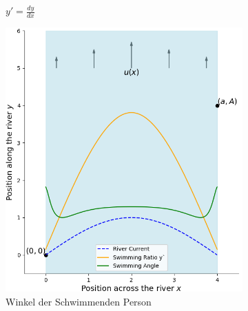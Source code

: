 \begin{figure}
\begin{subfigure}{0.48\textwidth}
        \caption{\(y' = \frac{dy}{dx}\)}
        \label{fig:diagonal_velocity}
    \end{subfigure}
    \par\bigskip
    \begin{subfigure}{0.48\textwidth}
        \centering
        \includegraphics[width=\textwidth]{papers/schwimmen/Grafiken/Figure_4-crop.png}	
        \caption{Winkel der Schwimmenden Person}
        \label{fig:squerd_velocity}
    \end{subfigure}
    \hfill  
    \begin{subfigure}{0.48\textwidth}
        \centering

\end{subfigure}
\end{figure}
